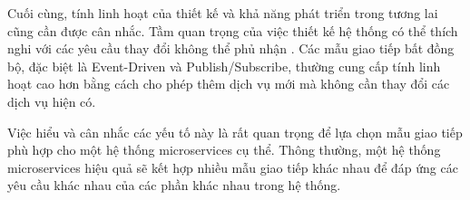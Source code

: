 Cuối cùng, tính linh hoạt của thiết kế và khả năng phát triển trong tương lai cũng cần được cân nhắc. Tầm quan trọng của việc thiết kế hệ thống có thể thích nghi với các yêu cầu thay đổi không thể phủ nhận \cite{newman2015}. Các mẫu giao tiếp bất đồng bộ, đặc biệt là Event-Driven và Publish/Subscribe, thường cung cấp tính linh hoạt cao hơn bằng cách cho phép thêm dịch vụ mới mà không cần thay đổi các dịch vụ hiện có.

Việc hiểu và cân nhắc các yếu tố này là rất quan trọng để lựa chọn mẫu giao tiếp phù hợp cho một hệ thống microservices cụ thể. Thông thường, một hệ thống microservices hiệu quả sẽ kết hợp nhiều mẫu giao tiếp khác nhau để đáp ứng các yêu cầu khác nhau của các phần khác nhau trong hệ thống.